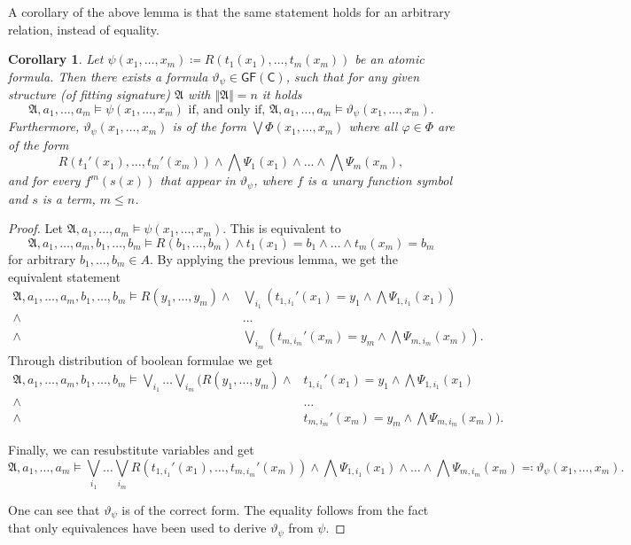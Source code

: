\documentclass[a4paper,11pt,DIV=15]{scrartcl} %
\renewcommand{\phi}{\varphi}
\theoremstyle{plain}
\newtheorem{corollary}[theorem]{Corollary}
\theoremstyle{definition}
\newcommand{\GFC}{\mathsf{GF}(\mathsf{C})}
\renewcommand{\theta}{\vartheta}
\begin{document}
A corollary of the above lemma is that the same statement holds for an arbitrary relation, instead of equality.

\begin{corollary}
	Let $\psi(x_1,\dots,x_m)\coloneqq R(t_1(x_1),\dots,t_m(x_m))$ be an atomic formula.
	Then there exists a formula $\theta_\psi\in\GFC$, such that for any given structure (of fitting signature) $\mathfrak A$ with $\Vert\mathfrak A \Vert=n$ it holds
	$$\mathfrak A,a_1,\dots,a_m\models \psi(x_1,\dots,x_m) \text{ if, and only if, } \mathfrak A,a_1,\dots,a_m\models \theta_\psi(x_1,\dots,x_m).$$
	Furthermore, $\theta_\psi(x_1,\dots,x_m)$ is of the form $\bigvee \Phi(x_1,\dots,x_m)$ where all $\phi\in\Phi$ are of the form
	$$R(t_1'(x_1),\dots,t_m'(x_m))\land \bigwedge\Psi_1(x_1)\land \dots\land\bigwedge \Psi_m(x_m),$$
	and for every $f^m(s(x))$ that appear in $\theta_\psi$, where $f$ is a unary function symbol and $s$ is a term, $m\leq n$.
\end{corollary}
\begin{proof}
	Let $\mathfrak A,a_1,\dots,a_m\models\psi(x_1,\dots,x_m)$.
	This is equivalent to 
	$$\mathfrak A,a_1,\dots,a_m,b_1,\dots,b_m\models R(b_1,\dots,b_m)\land t_1(x_1)=b_1\land\dots\land t_m(x_m)=b_m$$
	for arbitrary $b_1,\dots,b_m\in A$.
	By applying the previous lemma, we get the equivalent statement
	\begin{align*}
		\mathfrak A,a_1,\dots,a_m,b_1,\dots,b_m\models R(y_1,\dots,y_m) \land& \bigvee_{i_1}\left(t_{1,i_1}'(x_1)=y_1\land \bigwedge\Psi_{1,i_1}(x_1)\right) \\
		\land& \dots \\
		\land& \bigvee_{i_m}\left(t_{m,i_m}'(x_m)=y_m\land \bigwedge\Psi_{m,i_m}(x_m)\right).
	\end{align*}
	Through distribution of boolean formulae we get
	\begin{align*}
	\mathfrak A,a_1,\dots,a_m,b_1,\dots,b_m\models \bigvee_{i_1} \dots \bigvee_{i_m} ( R(y_1,\dots,y_m)\land &
	t_{1,i_1}'(x_1)=y_1 \land \bigwedge\Psi_{1,i_1}(x_1) \\
	\land & \dots \\
	\land & t_{m,i_m}'(x_m)=y_m \land \bigwedge\Psi_{m,i_m}(x_m) ).
	\end{align*}
	
	Finally, we can resubstitute variables and get
	$$\mathfrak A,a_1,\dots,a_m\models \bigvee_{i_1}\dots\bigvee_{i_m} R(t_{1,i_1}'(x_1),\dots,t_{m,i_m}'(x_m))\land \bigwedge\Psi_{1,i_1}(x_1)\land\dots\land\bigwedge\Psi_{m,i_m}(x_m)\eqqcolon \theta_\psi(x_1,\dots,x_m).$$
	
	One can see that $\theta_\psi$ is of the correct form.
	The equality follows from the fact that only equivalences have been used to derive $\theta_\psi$ from $\psi$.
\end{proof}
\end{document}
